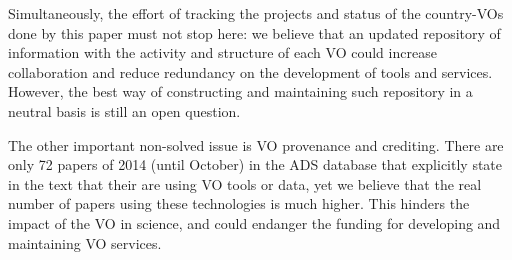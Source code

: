 Simultaneously, the effort of tracking the projects and status of the
country-VOs done by this paper must not stop here: we believe that an
updated repository of information with the activity and structure of
each VO could increase collaboration and reduce redundancy on the 
development of tools and services. However, the best way of constructing 
and maintaining such repository in a neutral basis is still an open question.

The other important non-solved issue is VO provenance and crediting. 
There are only 72 papers of 2014 (until October) in the ADS database 
that explicitly state in the text that their are using VO tools or data,
yet we believe that the real number of papers using these technologies
is much higher. This hinders the impact of the VO in science,
and could endanger the funding for developing and maintaining VO services.


